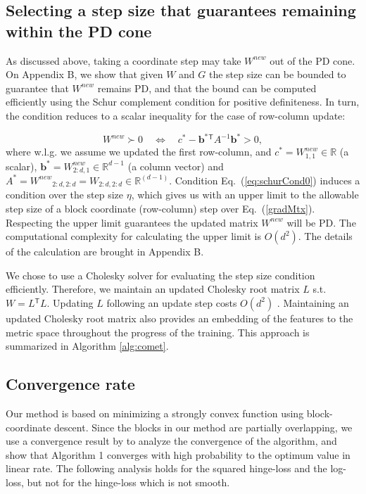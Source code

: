 \documentclass[twoside,11pt]{article}
\newcommand\mat[1]{{#1}}
\renewcommand\vec[1]{\mathbf{#1}}
\newcommand{\T}{{}^\mathsf{T}}
\newcommand{\W}{\mat{W}}
\newcommand{\newW}{{\mat{W^{new}}}}
\newcommand{\R}{\mathbb{R}}
\newcommand{\cholL}{\mat{L}}
\newcommand{\B}{\vec{b}}
\newcommand{\C}{c}
\newcommand{\invA}{A^{-1}}
\newcommand{\Wvec}{\W_{2:d,1}}
\newcommand{\Wscalar}{\W_{1,1}}
\renewcommand{\eqref}[1]{Eq.~(\ref{#1})}
\begin{document}
\subsection{Selecting a step size that guarantees remaining within the PD cone}\label{subsec:step}
As discussed above, taking a coordinate step may take $\newW$ out of the PD cone. On Appendix B, we show that given $\W$ and $\mat{G}$ the step size can be bounded to guarantee that $\newW$ remains PD, and that the bound can be computed efficiently using the Schur complement condition for positive definiteness. In turn, the condition reduces to a scalar inequality for the case of row-column update:

\begin{equation}\label{eq:schurCond0}
  \newW \succ  0 \quad \Leftrightarrow \quad  \C^* - \B^*\T \invA \B^* >  0,
\end{equation}
where w.l.g. we assume we updated the first row-column, and $\C^* = \Wscalar^{new} \in \R$ (a scalar), $\B^* = \Wvec^{new} \in \R^{d-1}$ (a column vector) and $A^* = \newW_{2:d,2:d} = \W_{2:d,2:d}\in \R^{(d-1)}$. Condition \eqref{eq:schurCond0} induces a condition over the step size $\eta$, which gives us with an upper limit to the allowable step size of a block coordinate (row-column) step over \eqref{gradMtx}. Respecting the upper limit guarantees the updated matrix $\W^{new}$ will be PD. The computational complexity for calculating the upper limit is $O(d^2)$. The details of the calculation are brought in Appendix B.

We chose to use a Cholesky solver \citep{CHOLMOD} for evaluating the step size condition efficiently. Therefore, we maintain an updated Cholesky root matrix $\cholL$ s.t. $W = \cholL\T \cholL$. Updating $\cholL$ following an update step costs $O(d^2)$ \citep{Davis05rowchol}. Maintaining an updated Cholesky root matrix also provides an embedding of the features to the metric space throughout the progress of the training. This approach is summarized in Algorithm \ref{alg:comet}.


\subsection{Convergence rate}
Our method is based on minimizing a strongly convex function using block-coordinate descent. Since the blocks in our method are partially overlapping, we use a convergence result by \citet{richtarik2013optimal} to analyze the convergence of the algorithm, and show that Algorithm 1 converges with high probability to the optimum value in linear rate. The following analysis holds for the squared hinge-loss and the log-loss, but not for the hinge-loss which is not smooth. 
\end{document}
